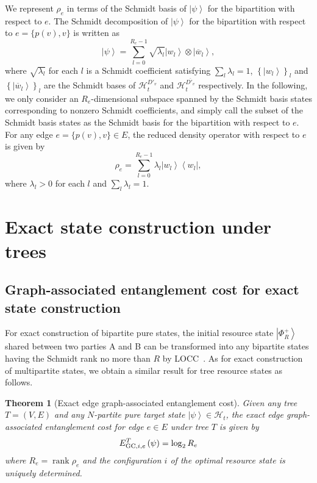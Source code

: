 \documentclass[preprintnumbers,aps,amsmath,amssymb,pra,twocolumn,showpacs,superscriptaddress,floatfix]{revtex4-1}
\def\Bra#1{\left\langle#1\right|}
\def\Ket#1{\left|#1\right\rangle}
\DeclareMathOperator{\rank}{rank}
\theoremstyle{plain}
\newtheorem{theorem}{Theorem}
\theoremstyle{definition}
\theoremstyle{remark}
\begin{document}
We represent $\rho_e$ in terms of the Schmidt basis of $\Ket\psi$ for the bipartition with respect to $e$.
The Schmidt decomposition of $\Ket\psi$ for the bipartition with respect to $e=\{p(v),v\}$ is written as
\begin{equation}
    \label{eq:schmidt_decomposition}
    \Ket\psi = \sum_{l=0}^{R_e-1}\sqrt{\lambda_{l}}\Ket{w_{l}}\otimes\Ket{\overline{w}_{l}},
\end{equation}
where $\sqrt{\lambda_{l}}$ for each $l$ is a Schmidt coefficient satisfying $\sum_l \lambda_l = 1$, ${\left\{\Ket{w_l}\right\}}_{l}$ and ${\left\{\Ket{\overline{w}_{l}}\right\}}_{l}$ are the Schmidt bases of $\mathcal{H}_t^{D'_v}$ and $\mathcal{H}_t^{\overline{D'_v}}$ respectively.   In the following, we only consider an $R_e$-dimensional subspace spanned by the Schmidt basis states corresponding to nonzero Schmidt coefficients, and simply call the subset of the Schmidt basis states as the Schmidt basis for the bipartition with respect to $e$.  For any edge $e=\{p(v),v\}\in E$, the reduced density operator with respect to $e$ is given by
\[
    \rho_e=\sum_{l=0}^{R_e -1}\lambda_{l} \Ket{w_{l}}\Bra{w_{l}},
\]
where $\lambda_{l}> 0$ for each $l$ and $\sum_{l}\lambda_{l}=1$.



\section{\label{sec:3}Exact state construction under trees}


\subsection{Graph-associated entanglement cost for exact state construction}

For exact construction of bipartite pure states,  the initial resource state  $\Ket{\Phi_R^+}$ shared between two parties A and B can be transformed into any bipartite states having the Schmidt rank no more than $R$ by LOCC\@~\cite{RefWorks:157}.    As for exact construction of multipartite states, we obtain a similar result for tree resource states as follows.
\begin{theorem}[Exact edge graph-associated entanglement cost]
\label{thm:exact}
Given any tree $T=(V,E)$ and any $N$-partite pure target state $\Ket{\psi} \in \mathcal{H}_t$, the exact edge graph-associated entanglement cost for edge $e \in E$ under tree $T$ is given by
\[
    E_{\textup{GC},i,e}^T\left(\psi\right)=\log_2 {R_e}
\]
where $R_e = \rank\rho_e$  and the configuration $i$ of the optimal resource state is uniquely determined.
\end{theorem}
\end{document}
